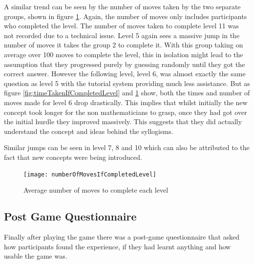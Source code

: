\documentclass[12pt,a4paper]{report}
\begin{document}
A similar trend can be seen by the number of moves taken by the two separate groups, shown in figure \ref{fig:numberOfMovesIfCompletedLevel}. Again, the number of moves only includes participants who completed the level. The number of moves taken to complete level 11 was not recorded due to a technical issue. Level 5 again sees a massive jump in the number of moves it takes the group 2 to complete it. With this group taking on average over 100 moves to complete the level, this in isolation might lead to the assumption that they progressed purely by guessing randomly until they got the correct answer. However the following level, level 6, was almost exactly the same question as level 5 with the tutorial system providing much less assistance. But as figure  \ref{fig:timeTakenIfCompletedLevel} and \ref{fig:numberOfMovesIfCompletedLevel} show, both the times and number of moves made for level 6 drop drastically. This implies that whilst initially the new concept took longer for the non mathematicians to grasp, once they had got over the initial hurdle they improved massively. This suggests that they did actually understand the concept and ideas behind the syllogisms. 

Similar jumps can be seen in level 7, 8 and 10 which can also be attributed to the fact that new concepts were being introduced.

\begin{figure}[h]
\centering
    \texttt{[image: numberOfMovesIfCompletedLevel]}
    \caption{Average number of moves to complete each level}
        \label{fig:numberOfMovesIfCompletedLevel}
\end{figure}
\FloatBarrier

\subsection{Post Game Questionnaire}
Finally after playing the game there was a post-game questionnaire that asked how participants found the experience, if they had learnt anything and how usable the game was.
\end{document}

